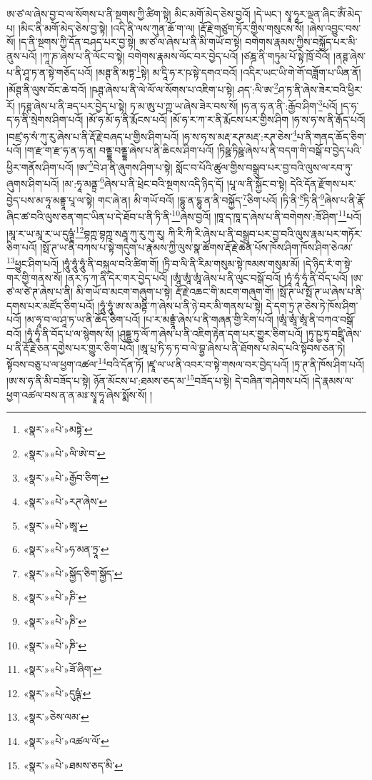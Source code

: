 ཨ་ཙ་ལ་ཞེས་བྱ་བ་ལ་སོགས་པ་ནི་སྔགས་ཀྱི་ཚིག་སྟེ། མིང་མགོ་མེད་ཅེས་བྱའོ། །དེ་ཡང་། སྭཱ་ཧཱར་ལྡན་ཞིང་ཨོཾ་མེད་པ། །མིང་ནི་མགོ་མེད་ཅེས་བྱ་སྟེ། །འདི་ནི་ལས་ཀུན་ཆོ་ག་ལ། །རྡོ་རྗེ་གཙུག་ཏོར་གྱིས་གསུངས་སོ། །ཞེས་འབྱུང་བས་སོ། །ད་ནི་སྔགས་ཀྱི་དོན་བཤད་པར་བྱ་སྟེ། ཨ་ཙ་ལ་ཞེས་པ་ནི་མི་གཡོ་བ་སྟེ། བགེགས་རྣམས་ཀྱིས་བསྐྱོད་པར་མི་ནུས་པའོ། །ཀཱ་ཎ་ཞེས་པ་ནི་ལོང་བ་སྟེ། བགེགས་རྣམས་ལོང་བར་བྱེད་པའོ། །ཙཎྜ་ནི་གཏུམ་པོ་སྟེ་ཁྲོ་བོའོ། །ནཊྚ་ཞེས་པ་ནི་ཤཱ་ཏ་ན་སྟེ་གཅོད་པའོ། །མཊྚ་ནི་མཏྟ་\footnote{«སྣར་»«པེ་»མཏྟེ་}སྟེ། མ་དཱི་ཧ་ར་ཥ་སྟེ་དགའ་བའོ། །འདིར་ཡང་ཡི་གེ་གོ་བཟློག་པ་ཡིན་ནོ། །མོཊྚ་ནི་ལུས་བོང་ཆེ་བའོ། །ཥཊྚ་ཞེས་པ་ནི་ལེ་ལོ་ལ་སོགས་པ་འཇིག་པ་སྟེ། ཤད་:ལི་ཨ་\footnote{«སྣར་»«པེ་»ལི་ཨེ་བ་}ཤ་ཏ་ནི་ཞེས་ཟེར་བའི་ཕྱིར་རོ། །ཏཊྚ་ཞེས་པ་ནི་ཟད་པར་བྱེད་པ་སྟེ། ཏ་མ་ཨུ་པ་ཀྵ་ཡ་ཞེས་ཟེར་བས་སོ། །ཧ་ན་ཧ་ན་ནི་:རྒྱོབ་ཤིག་\footnote{«སྣར་»«པེ་»རྒྱོབ་ཅིག་}པའོ། །ད་ཧ་ད་ཧ་ནི་སྲེགས་ཤིག་པའོ། །མོ་ཧ་མོ་ཧ་ནི་རྨོངས་པའོ། །མོ་ཧ་ར་ཀ་ར་ནི་རྨོངས་པར་གྱིས་ཤིག །ཧ་ས་ཧ་ས་ནི་རྒོད་པའོ། །བཛྲ་ཧ་སཾ་ཀུ་རུ་ཞེས་པ་ནི་རྡོ་རྗེ་བཞད་པ་གྱིས་ཤིག་པའོ། །ཧ་ས་ཧ་ས་མརྡ་རཊ་མརྡ་:རཊ་ཅེས་\footnote{«སྣར་»«པེ་»རཊ་ཞེས་}པ་ནི་གནད་ཆོད་ཅིག་པའོ། །ག་རྫ་ག་རྫ་ཧ་ན་ཧ་ན། བནྡྷ་བནྡྷ་ཞེས་པ་ནི་ཆིངས་ཤིག་པའོ། །ཏིཥྛ་ཏིཥྛ་ཞེས་པ་ནི་བདག་གི་བསྒོ་བ་བྱེད་པའི་ཕྱིར་གནོས་ཤིག་པའོ། །ཨ་\footnote{«སྣར་»«པེ་»ཨཱ་}བེ་ཤ་ནི་ཞུགས་ཤིག་པ་སྟེ། སློང་བ་པོའི་ཚུལ་གྱིས་བསྒྲུབ་པར་བྱ་བའི་ལུས་ལ་རབ་ཏུ་ཞུགས་ཤིག་པའོ། །མ་:ཧཱ་མནྟྲ་\footnote{«སྣར་»«པེ་»ཧ་མན་ཏྲཱ་}ཞེས་པ་ནི་ཕྲེང་བའི་སྔགས་འདི་ཉིད་དོ། །པཱ་ལ་ནི་སྐྱོང་བ་སྟེ། དེའི་དོན་རྫོགས་པར་བྱེད་པས་མ་ཧཱ་མནྟྲཱ་པཱ་ལ་སྟེ། གང་ཞེ་ན། མི་གཡོ་བའོ། །དྷུ་ན་དྷུ་ན་ནི་བསྐྱོད་\footnote{«སྣར་»«པེ་»སྐྱོད་ཅིག་སྐྱོད་}ཅིག་པའོ། །ཏི་ནི་\footnote{«སྣར་»«པེ་»ཎི་}ཏི་ནི་\footnote{«སྣར་»«པེ་»ཎི་}ཞེས་པ་ནི་རྣོ་ཞིང་ཚ་བའི་ལུས་ཅན་གང་ཡིན་པ་དེ་ཐོབ་པ་ནི་ཏི་ནི་\footnote{«སྣར་»«པེ་»ཎི་}ཞེས་བྱའོ། །ཁཱ་ད་ཁཱ་ད་ཞེས་པ་ནི་བགེགས་:ཟོ་ཤིག་\footnote{«སྣར་»«པེ་»ཟོ་ཞིག་}པའོ། །མཱ་ར་ཡ་མཱ་ར་ཡ་དུཥྚཱཾ་\footnote{«སྣར་»«པེ་»དུཥྚཾ་}བྷཀྵ་བྷཀྵ་སརྦཱ་ཀུ་རུ་ཀུ་རུ། ཀི་རི་ཀི་རི་ཞེས་པ་ནི་བསྒྲུབ་པར་བྱ་བའི་ལུས་རྣམ་པར་གཏོར་ཅིག་པའོ། །སྥོ་ཊ་ཡ་ནི་བཀས་པ་སྟེ་གདུག་པ་རྣམས་ཀྱི་ལུས་སྣ་ཚོགས་རྡོ་རྗེ་ཆེན་པོས་ཁོས་ཤིག་ཁོས་ཤིག་ཅེའམ་\footnote{«སྣར་»ཅེས་ལམ་}ཕྱུང་ཤིག་པའོ། །ཧཱུཾ་ཧཱུཾ་ཧཱུཾ་ནི་བསྐུལ་བའི་ཚིག་གོ། །ཏྲི་བ་ལི་ནི་རིམ་གསུམ་སྟེ་ཁམས་གསུམ་མོ། །དེ་ཉིད་རཾ་ག་སྟེ་གར་གྱི་གནས་སོ། །ནར་ཏ་ཀ་ནི་དེར་གར་བྱེད་པའོ། །ཨཱཾ་ཨཱཾ་ཨཱཾ་ཞེས་པ་ནི་ལུང་བསྒོ་བའོ། །ཧཱཾ་ཧཱཾ་ཧཱཾ་ནི་བོད་པའོ། །ཨ་ཙ་ལ་ཙེ་ཊ་ཞེས་པ་ནི། མི་གཡོ་བ་མངག་གཞུག་པ་སྟེ། རྡོ་རྗེ་འཆང་གི་མངག་གཞུག་གོ། །སྥོ་ཊ་ཡ་སྥོ་ཊ་ཡ་ཞེས་པ་ནི་དགས་པར་མཛོད་ཅིག་པའོ། །ཧཱུཾ་ཧཱུཾ་ཨ་ས་མནྟི་ཀ་ཞེས་པ་ནི་ཉེ་བར་མི་གནས་པ་སྟེ། དེ་དག་ཏྲ་ཊ་ཅེས་ཏེ་ཁོས་ཤིག་པའོ། །མ་ཧཱ་བ་ལ་ཤཱ་ཏ་ཡ་ནི་ཆོད་ཅིག་པའོ། །པ་ར་མནྟྲཱཾ་ཞེས་པ་ནི་གཞན་གྱི་རིག་པའོ། །ཨཱཾ་ཨཱཾ་ཨཱཾ་ནི་བཀའ་བསྒོ་བའོ། །ཧཱཾ་ཧཱཾ་ནི་བོད་པ་ལ་སྙེགས་སོ། །ཤུདྡྷྱ་ཏུ་ལོ་ཀ་ཞེས་པ་ནི་འཇིག་རྟེན་དག་པར་གྱུར་ཅིག་པའོ། །ཏུ་ཥྱ་ཏུ་བཛྲཱི་ཞེས་པ་ནི་རྡོ་རྗེ་ཅན་དགྱེས་པར་གྱུར་ཅིག་པའོ། །ཨཱ་པྲ་ཏི་ཧ་ཏ་བ་ལེ་བྷྱ་ཞེས་པ་ནི་ཐོགས་པ་མེད་པའི་སྟོབས་ཅན་ཏེ། སྟོབས་བཅུ་པ་ལ་ཕྱག་འཚལ་\footnote{«སྣར་»«པེ་»འཚལ་ལོ་}བའི་དོན་ཏོ། །ཛྭཱ་ལ་ཡ་ནི་འབར་བ་སྟེ་གསལ་བར་བྱེད་པའོ། །ཏྲ་ཊ་ནི་ཁོས་ཤིག་པའོ། །ཨ་ས་ཧ་ནི་མི་བཟོད་པ་སྟེ། ཉོན་མོངས་པ་:ཐམས་ཅད་མ་\footnote{«སྣར་»«པེ་»ཐམས་ཅད་མི་}བཟོད་པ་སྟེ། དེ་བཞིན་གཤེགས་པའོ། །དེ་རྣམས་ལ་ཕྱག་འཚལ་བས་ན་ན་མཿ་སྭཱ་ཧཱ་ཞེས་སྨོས་སོ། །
